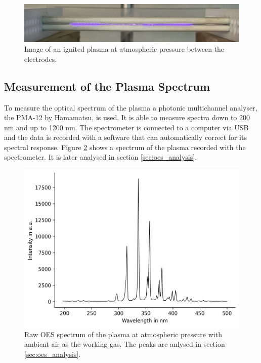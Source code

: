 \begin{figure}
    \centering
    \includegraphics[width=1\textwidth]{images/Plasma.png}
    \caption[Image of the APP]{Image of an ignited plasma at atmospheric pressure between the electrodes.}
    \label{fig:plasma}
\end{figure}


\subsection{Measurement of the Plasma Spectrum}
\label{sec:oes}
To measure the optical spectrum of the plasma a photonic multichannel analyser, the \textsc{PMA-12} by Hamamatsu, is used. It is able to measure spectra down to 200 nm and up to 1200 nm. The spectrometer is connected to a computer via USB and the data is recorded with a software that can automatically correct for its spectral response. Figure \ref{fig:oes} shows a spectrum of the plasma recorded with the spectrometer. It is later analysed in section \ref{sec:oes_analysis}.  

\begin{figure}
    \centering
    \includegraphics[width=.8\textwidth]{images/OES.png}
    \caption[Raw OES spectrum of the APP]{Raw OES spectrum of the plasma at atmospheric pressure with ambient air as the working gas. The peaks are anlysed in section \ref{sec:oes_analysis}.}
    \label{fig:oes}
\end{figure}

